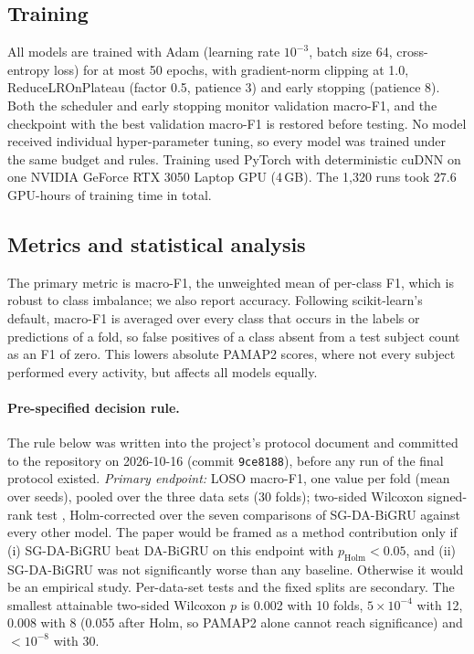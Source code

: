 \documentclass[11pt,a4paper]{article}
\begin{document}
\subsection{Training}
All models are trained with Adam \cite{kingma2015adam} (learning rate $10^{-3}$, batch size 64, cross-entropy loss) for at most 50 epochs, with gradient-norm clipping at 1.0, ReduceLROnPlateau (factor 0.5, patience 3) and early stopping (patience 8). Both the scheduler and early stopping monitor validation macro-F1, and the checkpoint with the best validation macro-F1 is restored before testing. No model received individual hyper-parameter tuning, so every model was trained under the same budget and rules. Training used PyTorch \cite{paszke2019pytorch} with deterministic cuDNN on one NVIDIA GeForce RTX 3050 Laptop GPU (4\,GB). The 1{,}320 runs took 27.6 GPU-hours of training time in total.

\subsection{Metrics and statistical analysis}
The primary metric is macro-F1, the unweighted mean of per-class F1, which is robust to class imbalance; we also report accuracy. Following scikit-learn's default, macro-F1 is averaged over every class that occurs in the labels or predictions of a fold, so false positives of a class absent from a test subject count as an F1 of zero. This lowers absolute PAMAP2 scores, where not every subject performed every activity, but affects all models equally.

\paragraph{Pre-specified decision rule.}
The rule below was written into the project's protocol document and committed to the repository on 2026-10-16 (commit \texttt{9ce8188}), before any run of the final protocol existed. \emph{Primary endpoint:} LOSO macro-F1, one value per fold (mean over seeds), pooled over the three data sets (30 folds); two-sided Wilcoxon signed-rank test \cite{wilcoxon1945individual}, Holm-corrected \cite{holm1979simple} over the seven comparisons of SG-DA-BiGRU against every other model. The paper would be framed as a method contribution only if (i) SG-DA-BiGRU beat DA-BiGRU on this endpoint with $p_\text{Holm}<0.05$, and (ii) SG-DA-BiGRU was not significantly worse than any baseline. Otherwise it would be an empirical study. Per-data-set tests and the fixed splits are secondary. The smallest attainable two-sided Wilcoxon $p$ is 0.002 with 10 folds, $5\times10^{-4}$ with 12, 0.008 with 8 (0.055 after Holm, so PAMAP2 alone cannot reach significance) and $<10^{-8}$ with 30.
\end{document}
